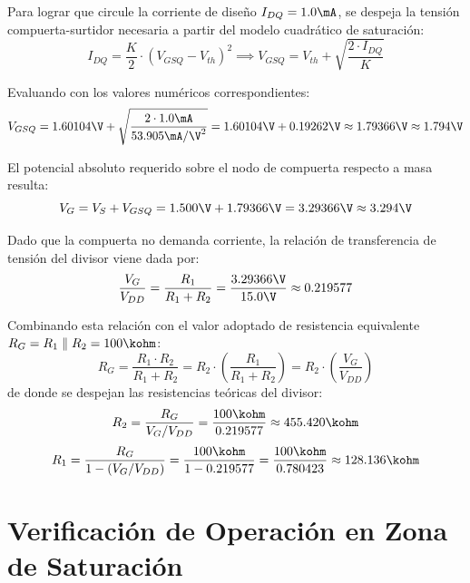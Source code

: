 Para lograr que circule la corriente de diseño $I_{DQ} = 1.0\mA$, se despeja la tensión compuerta-surtidor necesaria
a partir del modelo cuadrático de saturación:
\begin{equation}
  I_{DQ} = \frac{K}{2} \cdot (V_{GSQ} - V_{th})^2 \implies V_{GSQ} = V_{th} + \sqrt{\frac{2 \cdot I_{DQ}}{K}}
\end{equation}

Evaluando con los valores numéricos correspondientes:
\begin{equation}
  V_{GSQ} = 1.60104\V + \sqrt{\frac{2 \cdot 1.0\mA}{53.905\mA/\V^2}} = 1.60104\V + 0.19262\V \approx 1.79366\V \approx 1.794\V
  \label{eq:VGSQ_calculo}
\end{equation}

El potencial absoluto requerido sobre el nodo de compuerta respecto a masa resulta:
\begin{equation}
  V_G = V_S + V_{GSQ} = 1.500\V + 1.79366\V = 3.29366\V \approx 3.294\V
  \label{eq:VG_calculo}
\end{equation}

Dado que la compuerta no demanda corriente, la relación de transferencia de tensión del divisor viene dada por:
\begin{equation}
  \frac{V_G}{V_{DD}} = \frac{R_1}{R_1 + R_2} = \frac{3.29366\V}{15.0\V} \approx 0.219577
\end{equation}

Combinando esta relación con el valor adoptado de resistencia equivalente $R_G = R_1 \parallel R_2 = 100\kohm$:
\begin{equation}
  R_G = \frac{R_1 \cdot R_2}{R_1 + R_2} = R_2 \cdot \left(\frac{R_1}{R_1 + R_2}\right) = R_2 \cdot \left(\frac{V_G}{V_{DD}}\right)
\end{equation}
de donde se despejan las resistencias teóricas del divisor:
\begin{equation}
  R_2 = \frac{R_G}{V_G / V_{DD}} = \frac{100\kohm}{0.219577} \approx 455.420\kohm
  \label{eq:R2_teorico}
\end{equation}
\begin{equation}
  R_1 = \frac{R_G}{1 - (V_G / V_{DD})} = \frac{100\kohm}{1 - 0.219577} = \frac{100\kohm}{0.780423} \approx 128.136\kohm
  \label{eq:R1_teorico}
\end{equation}

\section{Verificación de Operación en Zona de Saturación}

